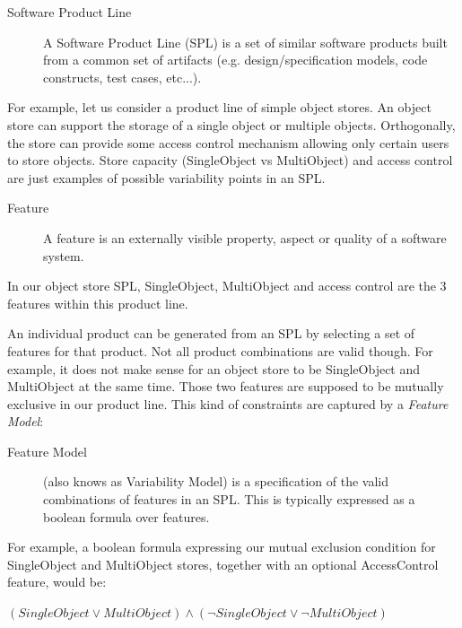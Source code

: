 \documentclass[11pt]{article}
\begin{document}
\begin{description}

\item[Software Product Line]
A Software Product Line (SPL) is a set of similar software products built from a common set of artifacts (e.g. design/specification models, code constructs, test cases, etc...).

\end{description}

For example, let us consider a product line of simple object stores. An object store can support the storage of a single object or multiple objects. Orthogonally, the store can provide some access control mechanism allowing only certain users to store objects. Store capacity (SingleObject vs MultiObject) and access control are just examples of possible variability points in an SPL.

\begin{description}

\item[Feature]
A feature is an externally visible property, aspect or quality of a software system.

\end{description}

In our object store SPL, SingleObject, MultiObject and access control are the 3 features within this product line.

An individual product can be generated from an SPL by selecting a set of features for that product. Not all product combinations are valid though. For example, it does not make sense for an object store to be SingleObject and MultiObject at the same time. Those two features are supposed to be mutually exclusive in our product line. This kind of constraints are captured by a \emph{Feature Model}:

\begin{description}

\item[Feature Model]
(also knows as Variability Model) is a specification of the valid combinations of features in an SPL. This is typically expressed as a boolean formula over features.

\end{description}

For example, a boolean formula expressing our mutual exclusion condition for SingleObject and MultiObject stores, together with an optional AccessControl feature, would be:

$(SingleObject \vee MultiObject) \wedge (\neg SingleObject \vee \neg MultiObject) $
\end{document}
